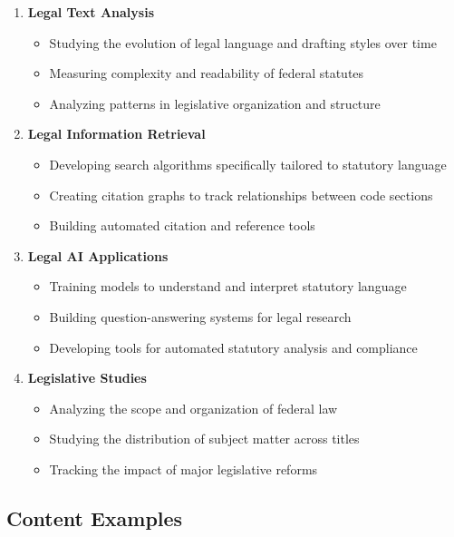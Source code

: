 \begin{enumerate}
    \item \textbf{Legal Text Analysis}
    \begin{itemize}
        \item Studying the evolution of legal language and drafting styles over time
        \item Measuring complexity and readability of federal statutes
        \item Analyzing patterns in legislative organization and structure
    \end{itemize}
    
    \item \textbf{Legal Information Retrieval}
    \begin{itemize}
        \item Developing search algorithms specifically tailored to statutory language
        \item Creating citation graphs to track relationships between code sections
        \item Building automated citation and reference tools
    \end{itemize}
    
    \item \textbf{Legal AI Applications}
    \begin{itemize}
        \item Training models to understand and interpret statutory language
        \item Building question-answering systems for legal research
        \item Developing tools for automated statutory analysis and compliance
    \end{itemize}
    
    \item \textbf{Legislative Studies}
    \begin{itemize}
        \item Analyzing the scope and organization of federal law
        \item Studying the distribution of subject matter across titles
        \item Tracking the impact of major legislative reforms
    \end{itemize}
\end{enumerate}

\subsection{Content Examples}

